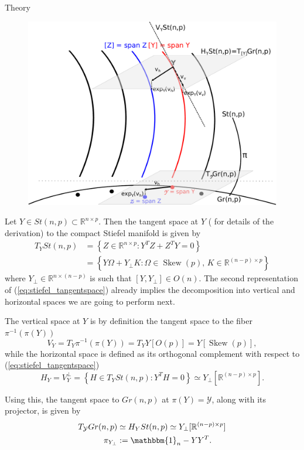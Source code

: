 \begin{chapter}{Theory}
\begin{figure}[h!]
        \centering
	    \includegraphics[width=0.6\linewidth]{./figures/theory/quotienttangentspace.pdf}
	\caption[Vertical and horizontal spaces]{ 
	}
	\label{fig:crosssection}
\end{figure}


Let $Y\in St(n,p)\subset\mathbb{R}^{n\times p}$. Then the tangent space at $Y$ (\cite{Absil2009} for details of the derivation) to the compact Stiefel manifold is given by
\begin{align}
    \label{eq:stiefel_tangentspace}
   T_YSt(n,p)	&= \left\lbrace Z\in\mathbb{R}^{n\times p}: Y^TZ+Z^TY=0 \right\rbrace\\
   &=  \left\lbrace Y\Omega + Y_{\bot}K: \Omega\in\operatorname{Skew}(p),\, K\in\mathbb{R}^{(n-p)\times p} \right\rbrace\nonumber
\end{align}
where $Y_{\bot}\in\mathbb{R}^{n\times (n-p)}$ is such that $[Y,Y_{\bot}]\in O(n)$. The second representation of (\ref{eq:stiefel_tangentspace})
already implies the decomposition into vertical and horizontal spaces we are going to perform next.

The vertical space at $Y$ is by definition the tangent space to the fiber $\pi^{-1}(\pi(Y))$
\begin{equation}
    \label{eq:stiefel_horizontalspace}
    V_Y = T_Y\pi^{-1}(\pi(Y))=T_YY[O(p)]=Y[\operatorname{Skew}(p)],
\end{equation}
while the horizontal space is defined as its orthogonal complement with respect to (\ref{eq:stiefel_tangentspace})
\begin{equation}
    \label{eq:stiefel_verticalspace}
    H_Y=V_Y^{\bot} =\left\lbrace H\in T_Y St(n,p):Y^TH=0 \right\rbrace \simeq Y_{\bot}[\mathbb{R}^{(n-p)\times p}].
\end{equation}

Using this, the tangent space to $Gr(n,p)$ at $\pi(Y)=\mathcal{Y}$, along with its projector, is given by 
\begin{align}
    \label{eq:grassmann_tangentspace}
    T_{\mathcal{Y}}Gr(n,p)&\simeq  H_YSt(n,p)\simeq Y_{\bot}[\mathbb{R}^{(n-p)\times p}]\\
    \pi_{Y_{\bot}}&:=\mathbbm{1}_n-YY^T.
\end{align}


\end{chapter}
